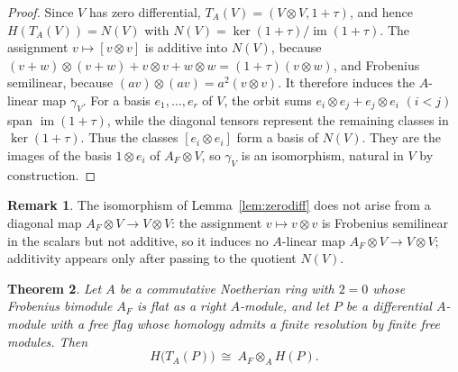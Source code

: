 \documentclass[11pt,reqno]{amsart}
\theoremstyle{plain}
\newtheorem{theorem}{Theorem}[section]
\theoremstyle{definition}
\newtheorem{remark}[theorem]{Remark}
\DeclareMathOperator{\im}{im}
\newcommand{\Tate}{T}                 %
\begin{document}
\begin{proof}
Since $V$ has zero differential, $\Tate_A(V)=(V\otimes V,1+\tau)$, and hence
$H(\Tate_A(V))=N(V)$ with $N(V)=\ker(1+\tau)/\im(1+\tau)$.  The assignment $v\mapsto[v\otimes v]$
is additive into $N(V)$, because $(v+w)\otimes(v+w)+v\otimes v+w\otimes w=(1+\tau)(v\otimes w)$, and
Frobenius semilinear, because $(av)\otimes(av)=a^{2}(v\otimes v)$.  It therefore induces the
$A$-linear map $\gamma_V$.  For a basis $e_1,\dots,e_r$ of $V$, the orbit sums
$e_i\otimes e_j+e_j\otimes e_i$ $(i<j)$ span $\im(1+\tau)$, while the diagonal tensors represent the
remaining classes in $\ker(1+\tau)$.  Thus the classes $[e_i\otimes e_i]$ form a basis of $N(V)$.
They are the images of the basis $1\otimes e_i$ of $A_F\otimes V$, so $\gamma_V$ is an isomorphism,
natural in $V$ by construction.
\end{proof}

\begin{remark}
The isomorphism of Lemma~\ref{lem:zerodiff} does not arise from a diagonal map
$A_F\otimes V\to V\otimes V$: the assignment $v\mapsto v\otimes v$ is Frobenius semilinear in the
scalars but not additive, so it induces no $A$-linear map $A_F\otimes V\to V\otimes V$; additivity
appears only after passing to the quotient $N(V)$.
\end{remark}

\begin{theorem}\label{thm:flag}
Let $A$ be a commutative Noetherian ring with $2=0$ whose Frobenius bimodule $A_F$ is flat as a
right $A$-module, and let $P$ be a differential $A$-module with a free flag whose homology admits a
finite resolution by finite free modules.  Then
\[
H\bigl(\Tate_A(P)\bigr)\ \cong\ A_F\otimes_AH(P).
\]
\end{theorem}
\end{document}
